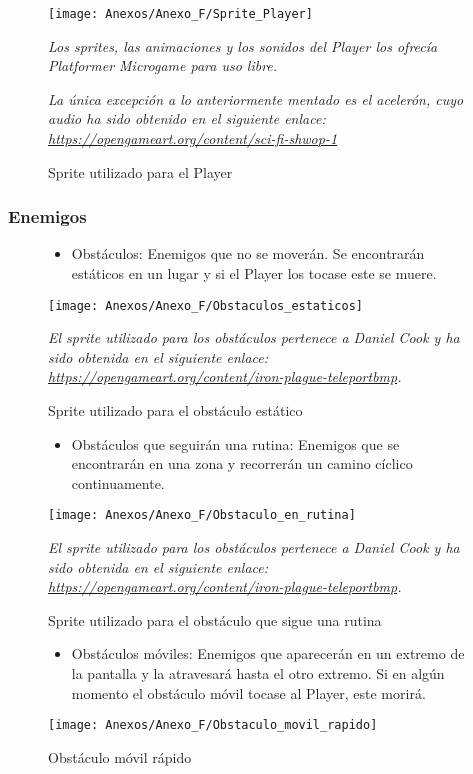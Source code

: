 \begin{figure}[h]
\centering
\texttt{[image: Anexos/Anexo\_F/Sprite\_Player]}
\caption{Sprite utilizado para el Player}
\raggedright
\textit{Los sprites, las animaciones y los sonidos del Player los ofrecía Platformer Microgame para uso libre.}

\textit{La única excepción a lo anteriormente mentado es el acelerón, cuyo audio ha sido obtenido en el siguiente enlace: \url{https://opengameart.org/content/sci-fi-shwop-1}}
\end{figure}
\clearpage

\subsubsection{Enemigos}
\begin{figure}[h]
\begin{itemize}
\item
Obstáculos: Enemigos que no se moverán. Se encontrarán estáticos en un lugar y si el Player los tocase este se muere.
\end{itemize}
\centering
\texttt{[image: Anexos/Anexo\_F/Obstaculos\_estaticos]}
\caption{Sprite utilizado para el obstáculo estático}
\raggedright
\textit{El sprite utilizado para los obstáculos pertenece a Daniel Cook y ha sido obtenida en el siguiente enlace: \url{https://opengameart.org/content/iron-plague-teleportbmp}.}
\end{figure}

\begin{figure}[h]
\begin{itemize}
\item
Obstáculos que seguirán una rutina: Enemigos que se encontrarán en una zona y recorrerán un camino cíclico continuamente.
\end{itemize}
\centering
\texttt{[image: Anexos/Anexo\_F/Obstaculo\_en\_rutina]}
\caption{Sprite utilizado para el obstáculo que sigue una rutina}
\raggedright
\textit{El sprite utilizado para los obstáculos pertenece a Daniel Cook y ha sido obtenida en el siguiente enlace: \url{https://opengameart.org/content/iron-plague-teleportbmp}.}
\end{figure}

\begin{figure}[h]
\begin{itemize}
\item
Obstáculos móviles: Enemigos que aparecerán en un extremo de la pantalla y la atravesará hasta el otro extremo. Si en algún momento el obstáculo móvil tocase al Player, este morirá.
\end{itemize}
\centering
\texttt{[image: Anexos/Anexo\_F/Obstaculo\_movil\_rapido]}
\caption{Obstáculo móvil rápido}
\end{figure}

